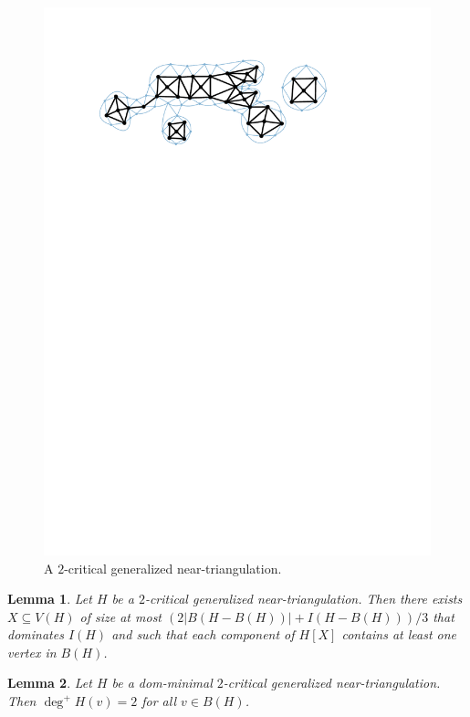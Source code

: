 \documentclass[12pt]{article}
\newtheorem{lem}{Lemma}
\theoremstyle{definition}
\begin{document}
\begin{figure}
  \centering
  \includegraphics[page=1]{figs/two_critical}
  \caption{A $2$-critical generalized near-triangulation.}
  \label{two_critical_figure}
\end{figure}


\begin{lem}\label{two_critical_handler}
  Let $H$ be a $2$-critical generalized near-triangulation.  Then there exists $X\subseteq V(H)$ of size at most $(2|B(H-B(H))| + I(H-B(H)))/3$ that dominates $I(H)$ and such that each component of $H[X]$ contains at least one vertex in $B(H)$.
\end{lem}


\begin{lem}
  Let $H$ be a dom-minimal $2$-critical generalized near-triangulation.  Then $\deg^+H(v)=2$ for all $v\in B(H)$.
\end{lem}
\end{document}
